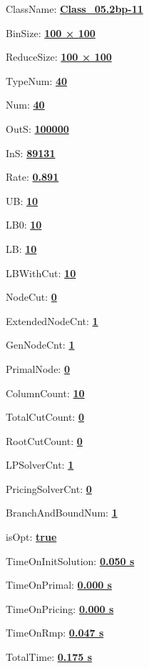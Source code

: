 \documentclass[11pt]{article}
\begin{document}
\pagestyle{empty}


ClassName: \underline{\textbf{Class_05.2bp-11}}
\par
BinSize: \underline{\textbf{100 × 100}}
\par
ReduceSize: \underline{\textbf{100 × 100}}
\par
TypeNum: \underline{\textbf{40}}
\par
Num: \underline{\textbf{40}}
\par
OutS: \underline{\textbf{100000}}
\par
InS: \underline{\textbf{89131}}
\par
Rate: \underline{\textbf{0.891}}
\par
UB: \underline{\textbf{10}}
\par
LB0: \underline{\textbf{10}}
\par
LB: \underline{\textbf{10}}
\par
LBWithCut: \underline{\textbf{10}}
\par
NodeCut: \underline{\textbf{0}}
\par
ExtendedNodeCnt: \underline{\textbf{1}}
\par
GenNodeCnt: \underline{\textbf{1}}
\par
PrimalNode: \underline{\textbf{0}}
\par
ColumnCount: \underline{\textbf{10}}
\par
TotalCutCount: \underline{\textbf{0}}
\par
RootCutCount: \underline{\textbf{0}}
\par
LPSolverCnt: \underline{\textbf{1}}
\par
PricingSolverCnt: \underline{\textbf{0}}
\par
BranchAndBoundNum: \underline{\textbf{1}}
\par
isOpt: \underline{\textbf{true}}
\par
TimeOnInitSolution: \underline{\textbf{0.050 s}}
\par
TimeOnPrimal: \underline{\textbf{0.000 s}}
\par
TimeOnPricing: \underline{\textbf{0.000 s}}
\par
TimeOnRmp: \underline{\textbf{0.047 s}}
\par
TotalTime: \underline{\textbf{0.175 s}}
\par
\newpage


\end{document}
